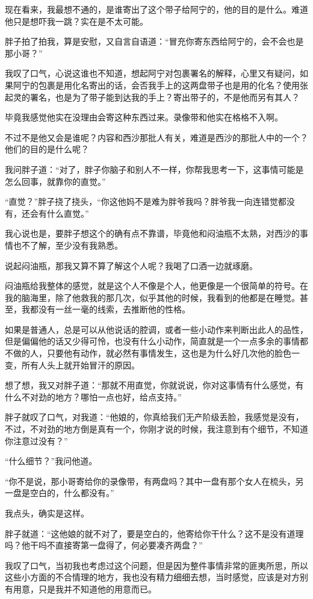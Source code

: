 现在看来，我最想不通的，是谁寄出了这个带子给阿宁的，他的目的是什么。难道他只是想吓我一跳？实在是不太可能。

胖子拍了拍我，算是安慰，又自言自语道：“冒充你寄东西给阿宁的，会不会也是那小哥？”

我叹了口气，心说这谁也不知道，想起阿宁对包裹署名的解释，心里又有疑问，如果阿宁的包裹是用化名寄出的话，会否我手上的这两盘带子也是用的化名？使用张起灵的署名，也是为了带子能到达我的手上？寄出带子的，不是他而另有其人？

毕竟我感觉他实在没理由会寄这种东西过来。录像带和他实在格格不入啊。

不过不是他又会是谁呢？内容和西沙那批人有关，难道是西沙的那批人中的一个？他们的目的是什么呢？

我问胖子道：“对了，胖子你脑子和别人不一样，你帮我思考一下，这事情可能是怎么回事，就靠你的直觉。”

“直觉？”胖子挠了挠头，“你这他妈不是难为胖爷我吗？胖爷我一向连错觉都没有，还会有什么直觉。”

我心说也是，要胖子想这个的确有点不靠谱，毕竟他和闷油瓶不太熟，对西沙的事情也不了解，至少没有我熟悉。

说起闷油瓶，那我又算不算了解这个人呢？我喝了口酒一边就琢磨。

闷油瓶给我整体的感觉，就是这个人不像是个人，他更像是一个很简单的符号。在我的脑海里，除了他救我的那几次，似乎其他的时候，我看到的他都是在睡觉。甚至，我都没有一丝一毫的线索，去推断他的性格。

如果是普通人，总是可以从他说话的腔调，或者一些小动作来判断出此人的品性，但是偏偏他的话又少得可怜，也没有什么小动作，简直就是一个一点多余的事情都不做的人，只要他有动作，就必然有事情发生，这也是为什么好几次他的脸色一变，所有人头上就开始冒汗的原因。

想了想，我又对胖子道：“那就不用直觉，你就说说，你对这事情有什么感觉，有什么不对劲的地方？哪怕一点也好，给点支持。”

胖子就叹了口气，对我道：“他娘的，你真给我们无产阶级丢脸，我感觉是没有，不过，不对劲的地方倒是真有一个，你刚才说的时候，我注意到有个细节，不知道你注意过没有？”

“什么细节？”我问他道。

“你不是说，那小哥寄给你的录像带，有两盘吗？其中一盘有那个女人在梳头，另一盘是空白的，什么都没有。”

我点头，确实是这样。

胖子就道：“这他娘的就不对了，要是空白的，他寄给你干什么？这不是没有道理吗？他干吗不直接寄第一盘得了，何必要凑齐两盘？”

我叹了口气，当初我也考虑过这个问题，但是因为整件事情非常的匪夷所思，所以这些小方面的不合情理的地方，我也没有精力细细去想，当时感觉，应该是对方别有用意，只是我并不知道他的用意而已。

